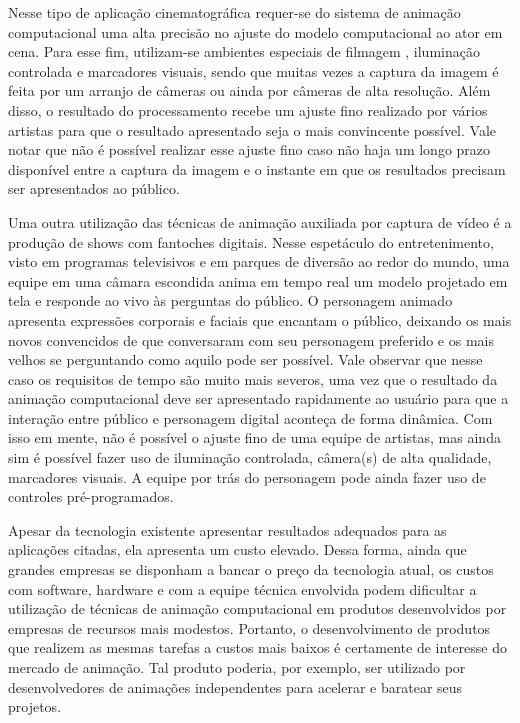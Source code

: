 Nesse tipo de aplicação cinematográfica requer-se do sistema de animação
computacional uma alta precisão no ajuste do modelo computacional ao ator em
cena. Para esse fim, utilizam-se ambientes especiais de filmagem , iluminação
controlada e marcadores visuais, sendo que muitas vezes a captura da imagem é
feita por um arranjo de câmeras ou ainda por câmeras de alta resolução. Além
disso, o resultado do processamento recebe um ajuste fino realizado por vários
artistas para que o resultado apresentado seja o mais convincente possível. Vale
notar que não é possível realizar esse ajuste fino caso não haja um longo prazo
disponível entre a captura da imagem e o instante em que os resultados precisam
ser apresentados ao público.

Uma outra utilização das técnicas de animação auxiliada por captura de vídeo é a
produção de shows com fantoches digitais.  Nesse espetáculo do entretenimento,
visto em programas televisivos e em parques de diversão ao redor do mundo, uma
equipe em uma câmara escondida anima em tempo real um modelo projetado em tela e
responde ao vivo às perguntas do público. O personagem animado apresenta
expressões corporais e faciais que encantam o público, deixando os mais novos
convencidos de que conversaram com seu personagem preferido e os mais velhos se
perguntando como aquilo pode ser possível. Vale observar que nesse caso os
requisitos de tempo são muito mais severos, uma vez que o resultado da animação
computacional deve ser apresentado rapidamente ao usuário para que a interação
entre público e personagem digital aconteça de forma dinâmica. Com isso em
mente, não é possível o ajuste fino de uma equipe de artistas, mas ainda sim é
possível fazer uso de iluminação controlada, câmera(s) de alta qualidade,
marcadores visuais. A equipe por trás do personagem pode ainda fazer uso de
controles pré-programados.

Apesar da tecnologia existente apresentar resultados adequados para as
aplicações citadas, ela apresenta um custo elevado. Dessa forma, ainda que
grandes empresas se disponham a bancar o preço da tecnologia atual, os custos
com software, hardware e com a equipe técnica envolvida podem dificultar a
utilização de técnicas de animação computacional em produtos desenvolvidos por
empresas de recursos mais modestos.  Portanto, o desenvolvimento de produtos que
realizem as mesmas tarefas a custos mais baixos é certamente de interesse do
mercado de animação. Tal produto poderia, por exemplo, ser utilizado por
desenvolvedores de animações independentes para acelerar e baratear seus
projetos.  

